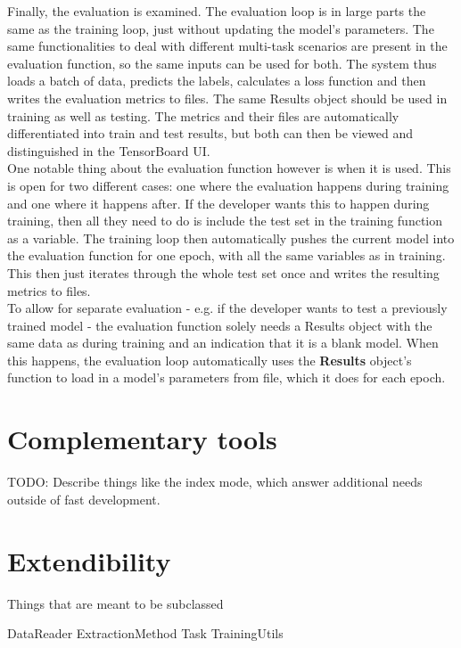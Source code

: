 Finally, the evaluation is examined. The evaluation loop is in large parts the same as the training loop, just without updating the model's parameters. The same functionalities to deal with different multi-task scenarios are present in the evaluation function, so the same inputs can be used for both. The system thus loads a batch of data, predicts the labels, calculates a loss function and then writes the evaluation metrics to files. The same Results object should be used in training as well as testing. The metrics and their files are automatically differentiated into train and test results, but both can then be viewed and distinguished in the TensorBoard UI. \\

One notable thing about the evaluation function however is when it is used. This is open for two different cases: one where the evaluation happens during training and one where it happens after. If the developer wants this to happen during training, then all they need to do is include the test set in the training function as a variable. The training loop then automatically pushes the current model into the evaluation function for one epoch, with all the same variables as in training. This then just iterates through the whole test set once and writes the resulting metrics to files. \\

To allow for separate evaluation - e.g. if the developer wants to test a previously trained model - the evaluation function solely needs a Results object with the same data as during training and an indication that it is a blank model. When this happens, the evaluation loop automatically uses the \textbf{Results} object's function to load in a model's parameters from file, which it does for each epoch. \\

\section{Complementary tools}

TODO: Describe things like the index mode, which answer additional needs outside of fast development.

\section{Extendibility}


Things that are meant to be subclassed

DataReader
ExtractionMethod
Task
TrainingUtils

